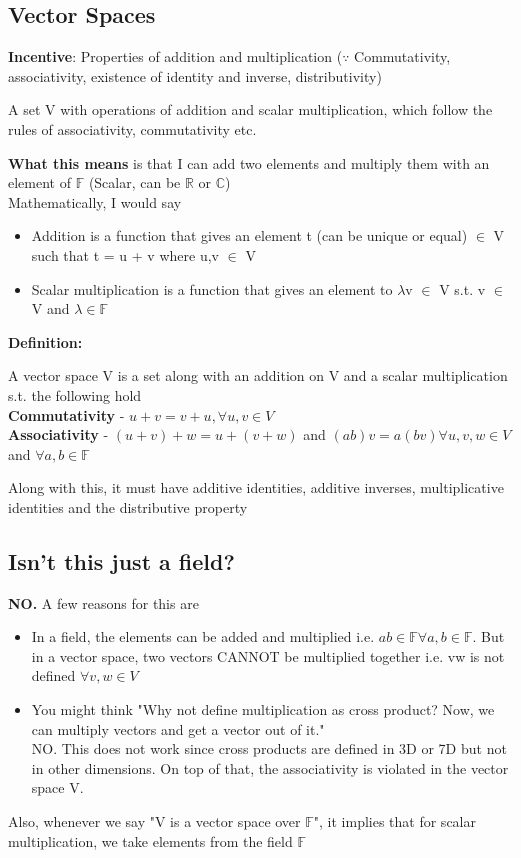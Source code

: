 \documentclass{article}
\begin{document}
\subsection{Vector Spaces}
\textbf{Incentive}: Properties of addition and multiplication ($\because$ Commutativity, associativity, existence of identity and inverse, distributivity) 
\begin{center}
    A set V with operations of addition and scalar multiplication, which follow the rules of associativity, commutativity etc.
\end{center}
\textbf{What this means} is that I can add two elements and multiply them with an element of $\mathbb{F}$ (Scalar, can be $\mathbb{R}$ or $\mathbb{C}$) \\ 
Mathematically, I would say \\
\begin{itemize}
    \item Addition is a function that gives an element t (can be unique or equal) $\in$ V such that t = u + v where u,v $\in$ V
    \item Scalar multiplication is a function that gives an element to $\lambda$v $\in$ V s.t. v $\in$ V and $\lambda\in \mathbb{F}$ 
\end{itemize}
\textbf{Definition:} 
\begin{center}
    A vector space V is a set along with an addition on V and a scalar multiplication s.t. the following hold \\
    \textbf{Commutativity} - $u+v = v+u, \forall u,v \in V$ \\
    \textbf{Associativity} - $(u+v)+w = u + (v+w)$ and $(ab)v = a(bv) \forall u,v,w \in V$ and $\forall a,b \in \mathbb{F}$ \\
\end{center}
Along with this, it must have additive identities, additive inverses, multiplicative identities and the distributive property

\subsection{Isn't this just a field?}
\textbf{NO.} A few reasons for this are 
\begin{itemize}
    \item In a field, the elements can be added and multiplied i.e. $ab \in \mathbb{F} \forall a,b\in \mathbb{F}$. But in a vector space, two vectors CANNOT be multiplied together i.e. vw is not defined $\forall v,w \in V$
    \item You might think "Why not define multiplication as cross product? Now, we can multiply vectors and get a vector out of it." \\
    NO. This does not work since cross products are defined in 3D or 7D but not in other dimensions. On top of that, the associativity is violated in the vector space V.
\end{itemize}
Also, whenever we say "V is a vector space over $\mathbb{F}$", it implies that for scalar multiplication, we take elements from the field $\mathbb{F}$
\end{document}
